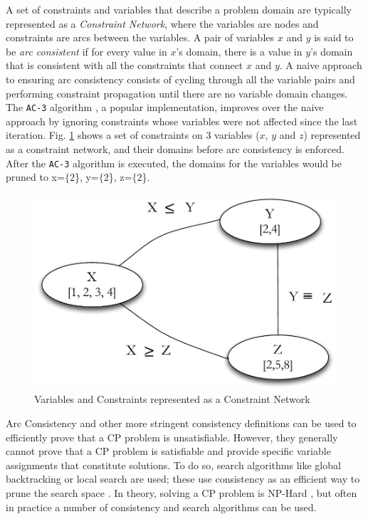 {A set of constraints and variables that describe a problem domain are
typically represented as a \emph{Constraint Network}, where the
variables are nodes and constraints are arcs between the variables. A
pair of variables $x$ and $y$ is said to be \emph{arc consistent} if
for every value in $x$'s domain, there is a value in $y$'s domain that
is consistent with all the constraints that connect $x$ and $y$.  A
naive approach to ensuring arc consistency consists of cycling through
all the variable pairs and performing constraint propagation until
there are no variable domain changes. The \texttt{AC-3} algorithm
\cite{mackworth77}, a popular implementation, improves over the naive
approach by ignoring constraints whose variables were not affected
since the last iteration. Fig. \ref{fig:constraintnet} shows a set of
constraints on $3$ variables ($x$, $y$ and $z$) represented as a
constraint network, and their domains before arc consistency is
enforced.  After the \texttt{AC-3} algorithm is executed, the domains
for the variables would be pruned to x=$\{2$\}, y=$\{2$\}, z=$\{2$\}.

\begin{figure}[!t]
\centering
\includegraphics[scale=0.3]{figs/constraint-net.pdf}
\caption{\small Variables and Constraints represented as a Constraint Network}
\label{fig:constraintnet}
\end{figure}

Arc Consistency and other more stringent consistency definitions can
be used to efficiently prove that a \textsf{CP} problem is
unsatisfiable. However, they generally cannot prove that a \textsf{CP}
problem is satisfiable and provide specific variable assignments that
constitute solutions. To do so, search algorithms like global
backtracking \cite{hooker05} or local search are used; these use
consistency as an efficient way to prune the search space
\cite{cp06}. In theory, solving a \textsf{CP} problem is NP-Hard
\cite{ghallab04}, but often in practice a number of consistency and
search algorithms can be used.

}

